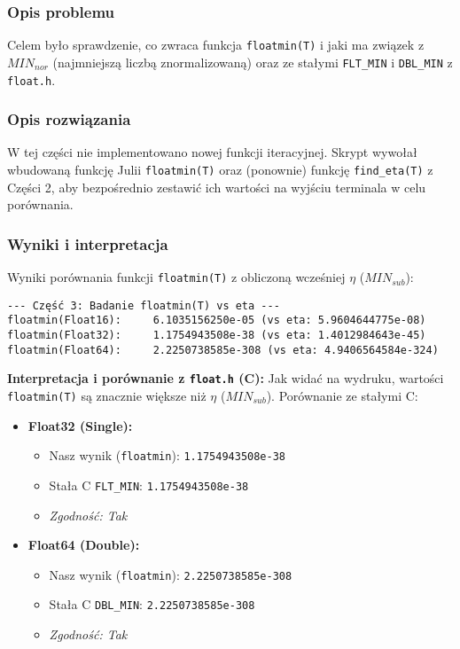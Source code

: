 \documentclass[11pt, a4paper]{article}
\begin{document}
\subsubsection{Opis problemu}
Celem było sprawdzenie, co zwraca funkcja \texttt{floatmin(T)} i jaki ma związek z $MIN_{nor}$ (najmniejszą liczbą znormalizowaną) oraz ze stałymi \texttt{FLT\_MIN} i \texttt{DBL\_MIN} z \texttt{float.h}.

\subsubsection{Opis rozwiązania}
W tej części nie implementowano nowej funkcji iteracyjnej. Skrypt wywołał wbudowaną funkcję Julii \texttt{floatmin(T)} oraz (ponownie) funkcję \texttt{find\_eta(T)} z Części 2, aby bezpośrednio zestawić ich wartości na wyjściu terminala w celu porównania.

\subsubsection{Wyniki i interpretacja}
Wyniki porównania funkcji \texttt{floatmin(T)} z obliczoną wcześniej $\eta$ ($MIN_{sub}$):
\begin{verbatim}
--- Część 3: Badanie floatmin(T) vs eta ---
floatmin(Float16):     6.1035156250e-05 (vs eta: 5.9604644775e-08)
floatmin(Float32):     1.1754943508e-38 (vs eta: 1.4012984643e-45)
floatmin(Float64):     2.2250738585e-308 (vs eta: 4.9406564584e-324)
\end{verbatim}

\noindent \textbf{Interpretacja i porównanie z \texttt{float.h} (C):}
Jak widać na wydruku, wartości \texttt{floatmin(T)} są znacznie większe niż $\eta$ ($MIN_{sub}$). Porównanie ze stałymi C:

\begin{itemize}
    \item \textbf{Float32 (Single):}
    \begin{itemize}
        \item Nasz wynik (\texttt{floatmin}): \texttt{1.1754943508e-38}
        \item Stała C \texttt{FLT\_MIN}: \texttt{1.1754943508e-38}
        \item \textit{Zgodność: Tak}
    \end{itemize}
    \item \textbf{Float64 (Double):}
    \begin{itemize}
        \item Nasz wynik (\texttt{floatmin}): \texttt{2.2250738585e-308}
        \item Stała C \texttt{DBL\_MIN}: \texttt{2.2250738585e-308}
        \item \textit{Zgodność: Tak}
    \end{itemize}
\end{itemize}
\end{document}
